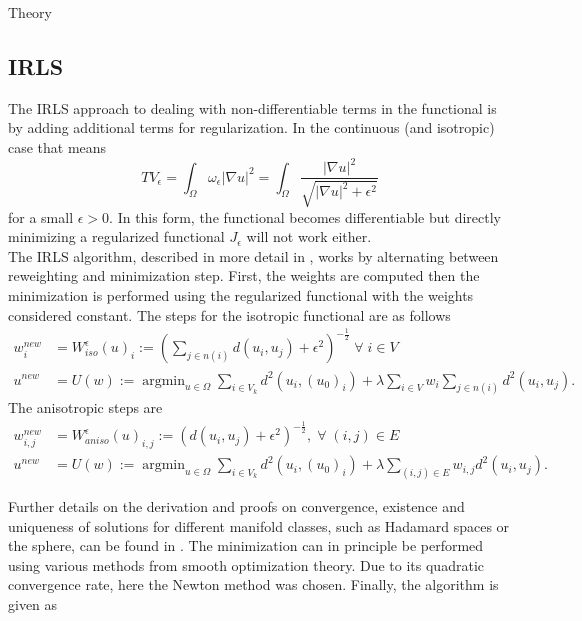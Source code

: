 \begin{chapter}{Theory}


\subsection{IRLS} %
\label{sub:IRLS}
The IRLS approach to dealing with non-differentiable terms in the functional is by adding additional terms for regularization. In the continuous (and isotropic) case that means
\begin{equation}
    \label{eq:regulzarized_tv}
    TV_{\epsilon}=\int_{\Omega}\omega_{\epsilon}|\nabla u|^2 =\int_{\Omega}\frac{|\nabla u|^2}{\sqrt{|\nabla u|^2+\epsilon^2}}
\end{equation}
for a small $\epsilon>0$. In this form, the functional becomes differentiable but directly minimizing a
regularized functional $J_{\epsilon}$ will not work either.\\

The IRLS algorithm, described in more detail in \cite{Rodriguez}, works by alternating between reweighting and minimization step. First, the weights are computed then 
the minimization is performed using the regularized functional with the weights considered constant.
 The steps for the isotropic functional are as follows
\begin{align}
    w_{i}^{new} &= W^{\epsilon}_{iso}(u)_i := \left( \sum_{j\in n(i)}d(u_i,u_j)+\epsilon^2\right)^{-\frac{1}{2}}\; \forall\;i\in V \\
    u^{new} &= U(w) := \operatorname{argmin}_{u\in\Omega}\sum_{i\in V_k}d^2(u_i,(u_0)_{i})+\lambda\sum_{i\in V}w_i\sum_{j\in n(i)}d^2(u_i,u_j).
\end{align}
The anisotropic steps are
\begin{align}
    w_{i,j}^{new} &= W^{\epsilon}_{aniso}(u)_{i,j} := \left( d(u_i,u_j)+\epsilon^2\right)^{-\frac{1}{2}},\; \forall\;(i,j)\in E \\
    u^{new} &= U(w) := \operatorname{argmin}_{u\in\Omega}\sum_{i\in V_k}d^2(u_i,(u_0)_{i})+\lambda\sum_{(i,j)\in E}w_{i,j}d^2(u_i,u_j).
\end{align}

Further details on the derivation and proofs on convergence, existence and uniqueness of solutions for different manifold classes, such as Hadamard spaces or the sphere,
can be found in \cite{SprecherIRLS}. The minimization can in principle be performed using various methods from smooth optimization theory. Due to its quadratic
convergence rate, here the Newton method was chosen. Finally, the algorithm is given as 


\end{chapter}

